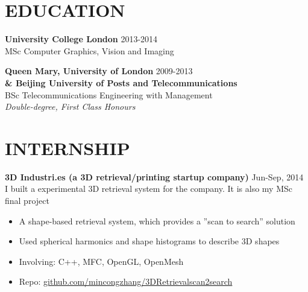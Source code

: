 \documentclass[line,margin]{res}
\begin{document}
\address{}
\address{}

\begin{resume}
\section{EDUCATION} 
{\bf University College London} \hfill{\textcolor[rgb]{0.7,0.7,0.7}{2013-2014}}\\
MSc Computer Graphics, Vision and Imaging

{\bf Queen Mary, University of London} \hfill{\textcolor[rgb]{0.7,0.7,0.7}{2009-2013}}\\
{\bf \& Beijing University of Posts and Telecommunications}\\
BSc Telecommunications Engineering with Management\\
\emph{Double-degree, First Class Honours}

\section{INTERNSHIP} 
\renewcommand{\labelitemi}{-}

{\bf 3D Industri.es (a 3D retrieval/printing startup company)}
\hfill{\textcolor[rgb]{0.7,0.7,0.7}{Jun-Sep, 2014}}\\
I built a experimental 3D retrieval system for the company. It is also my MSc final project
\begin{itemize}\itemsep -2pt %
    \item A shape-based retrieval system, which provides a ”scan to search” solution
    \item Used spherical harmonics and shape histograms to describe 3D shapes
    \item Involving: C++, MFC, OpenGL, OpenMesh
    \item Repo: \href{https://github.com/mincongzhang/3D\textunderscore Retrieval\textunderscore scan2search}{github.com/mincongzhang/3D\textunderscore  Retrieval\textunderscore scan2search}
\end{itemize}

\renewcommand{\labelitemi}{$\bullet$}
\renewcommand{\labelitemii}{-}


\end{resume}
\end{document}
